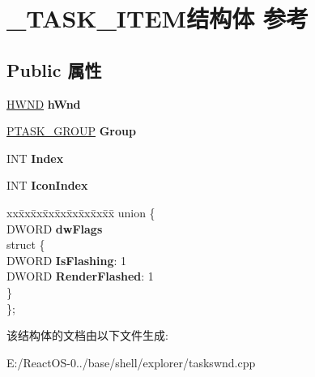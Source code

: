 \hypertarget{struct___t_a_s_k___i_t_e_m}{}\section{\+\_\+\+T\+A\+S\+K\+\_\+\+I\+T\+E\+M结构体 参考}
\label{struct___t_a_s_k___i_t_e_m}
\subsection*{Public 属性}
\begin{DoxyCompactItemize}
\item 
\mbox{\label{struct___t_a_s_k___i_t_e_m_afadc9020bd11cceb84c9b2b841515177}} 
\hyperlink{interfacevoid}{H\+W\+ND} {\bfseries h\+Wnd}
\item 
\mbox{\label{struct___t_a_s_k___i_t_e_m_ab0ff42fedf2f040d851011a2359b561b}} 
\hyperlink{struct___t_a_s_k___g_r_o_u_p}{P\+T\+A\+S\+K\+\_\+\+G\+R\+O\+UP} {\bfseries Group}
\item 
\mbox{\label{struct___t_a_s_k___i_t_e_m_af22fcb1d072d7dd17c0be78dc9d9e8eb}} 
I\+NT {\bfseries Index}
\item 
\mbox{\label{struct___t_a_s_k___i_t_e_m_a98a91e5ed1b03a543fc92ba5c982ab94}} 
I\+NT {\bfseries Icon\+Index}
\item 
\mbox{\label{struct___t_a_s_k___i_t_e_m_a1c095ac2673f7919c331b136ac1250a2}} 
\begin{tabbing}
xx\=xx\=xx\=xx\=xx\=xx\=xx\=xx\=xx\=\kill
union \{\\
\>DWORD {\bfseries dwFlags}\\
\mbox{\label{union___t_a_s_k___i_t_e_m_1_1_0D71_a6a6ad86ca01ddbe93f9f3c211caedc7e}} 
\>struct \{\\
\>\>DWORD {\bfseries IsFlashing}: 1\\
\>\>DWORD {\bfseries RenderFlashed}: 1\\
\>\} \\
\}; \\

\end{tabbing}\end{DoxyCompactItemize}


该结构体的文档由以下文件生成\+:\begin{DoxyCompactItemize}
\item 
E\+:/\+React\+O\+S-\/0../base/shell/explorer/taskswnd.\+cpp\end{DoxyCompactItemize}
